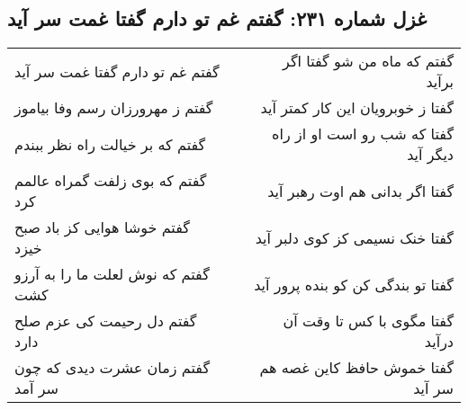 \begin{center}
\section*{غزل شماره ۲۳۱: گفتم غم تو دارم گفتا غمت سر آید}
\label{sec:sh231}
\begin{longtable}{l p{0.5cm} r}
گفتم غم تو دارم گفتا غمت سر آید
&&
گفتم که ماه من شو گفتا اگر برآید
\\
گفتم ز مهرورزان رسم وفا بیاموز
&&
گفتا ز خوبرویان این کار کمتر آید
\\
گفتم که بر خیالت راه نظر ببندم
&&
گفتا که شب رو است او از راه دیگر آید
\\
گفتم که بوی زلفت گمراه عالمم کرد
&&
گفتا اگر بدانی هم اوت رهبر آید
\\
گفتم خوشا هوایی کز باد صبح خیزد
&&
گفتا خنک نسیمی کز کوی دلبر آید
\\
گفتم که نوش لعلت ما را به آرزو کشت
&&
گفتا تو بندگی کن کو بنده پرور آید
\\
گفتم دل رحیمت کی عزم صلح دارد
&&
گفتا مگوی با کس تا وقت آن درآید
\\
گفتم زمان عشرت دیدی که چون سر آمد
&&
گفتا خموش حافظ کاین غصه هم سر آید
\\
\end{longtable}
\end{center}
